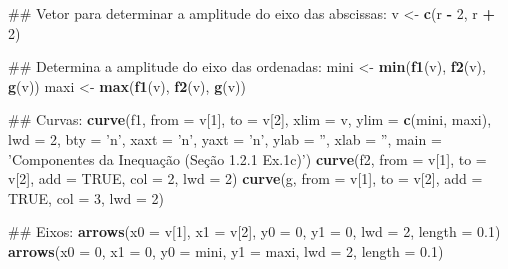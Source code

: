 \documentclass[]{book}
\newenvironment{Shaded}{\begin{snugshade}}{\end{snugshade}}
\newcommand{\KeywordTok}[1]{\textcolor[rgb]{0.13,0.29,0.53}{\textbf{#1}}}
\newcommand{\DataTypeTok}[1]{\textcolor[rgb]{0.13,0.29,0.53}{#1}}
\newcommand{\DecValTok}[1]{\textcolor[rgb]{0.00,0.00,0.81}{#1}}
\newcommand{\FloatTok}[1]{\textcolor[rgb]{0.00,0.00,0.81}{#1}}
\newcommand{\StringTok}[1]{\textcolor[rgb]{0.31,0.60,0.02}{#1}}
\newcommand{\OtherTok}[1]{\textcolor[rgb]{0.56,0.35,0.01}{#1}}
\newcommand{\OperatorTok}[1]{\textcolor[rgb]{0.81,0.36,0.00}{\textbf{#1}}}
\newcommand{\NormalTok}[1]{#1}
\begin{document}
\begin{enumerate}
\begin{Shaded}
\begin{Highlighting}[]
\NormalTok{##  Vetor para determinar a amplitude do eixo das abscissas:}
\NormalTok{v <-}\StringTok{ }\KeywordTok{c}\NormalTok{(r }\OperatorTok{-}\StringTok{ }\DecValTok{2}\NormalTok{, r }\OperatorTok{+}\StringTok{ }\DecValTok{2}\NormalTok{)}

\NormalTok{##  Determina  a amplitude do eixo das ordenadas:}
\NormalTok{mini <-}\StringTok{ }\KeywordTok{min}\NormalTok{(}\KeywordTok{f1}\NormalTok{(v), }\KeywordTok{f2}\NormalTok{(v), }\KeywordTok{g}\NormalTok{(v))}
\NormalTok{maxi <-}\StringTok{ }\KeywordTok{max}\NormalTok{(}\KeywordTok{f1}\NormalTok{(v), }\KeywordTok{f2}\NormalTok{(v), }\KeywordTok{g}\NormalTok{(v))}

\NormalTok{##  Curvas:}
\KeywordTok{curve}\NormalTok{(f1, }\DataTypeTok{from =}\NormalTok{ v[}\DecValTok{1}\NormalTok{], }\DataTypeTok{to =}\NormalTok{ v[}\DecValTok{2}\NormalTok{], }\DataTypeTok{xlim =}\NormalTok{ v, }\DataTypeTok{ylim =} \KeywordTok{c}\NormalTok{(mini, maxi), }\DataTypeTok{lwd =} \DecValTok{2}\NormalTok{,}
  \DataTypeTok{bty =} \StringTok{'n'}\NormalTok{, }\DataTypeTok{xaxt =} \StringTok{'n'}\NormalTok{, }\DataTypeTok{yaxt =} \StringTok{'n'}\NormalTok{, }\DataTypeTok{ylab =} \StringTok{''}\NormalTok{, }\DataTypeTok{xlab =} \StringTok{''}\NormalTok{,}
  \DataTypeTok{main =} \StringTok{'Componentes da Inequação (Seção 1.2.1 Ex.1c)'}\NormalTok{)}
\KeywordTok{curve}\NormalTok{(f2, }\DataTypeTok{from =}\NormalTok{ v[}\DecValTok{1}\NormalTok{], }\DataTypeTok{to =}\NormalTok{ v[}\DecValTok{2}\NormalTok{], }\DataTypeTok{add =} \OtherTok{TRUE}\NormalTok{, }\DataTypeTok{col =} \DecValTok{2}\NormalTok{, }\DataTypeTok{lwd =} \DecValTok{2}\NormalTok{)}
\KeywordTok{curve}\NormalTok{(g, }\DataTypeTok{from =}\NormalTok{ v[}\DecValTok{1}\NormalTok{], }\DataTypeTok{to =}\NormalTok{ v[}\DecValTok{2}\NormalTok{], }\DataTypeTok{add =} \OtherTok{TRUE}\NormalTok{, }\DataTypeTok{col =} \DecValTok{3}\NormalTok{, }\DataTypeTok{lwd =} \DecValTok{2}\NormalTok{)}

\NormalTok{##  Eixos:}
\KeywordTok{arrows}\NormalTok{(}\DataTypeTok{x0 =}\NormalTok{ v[}\DecValTok{1}\NormalTok{], }\DataTypeTok{x1 =}\NormalTok{ v[}\DecValTok{2}\NormalTok{],}
   \DataTypeTok{y0 =} \DecValTok{0}\NormalTok{, }\DataTypeTok{y1 =} \DecValTok{0}\NormalTok{, }\DataTypeTok{lwd =} \DecValTok{2}\NormalTok{, }\DataTypeTok{length =} \FloatTok{0.1}\NormalTok{)}
\KeywordTok{arrows}\NormalTok{(}\DataTypeTok{x0 =} \DecValTok{0}\NormalTok{, }\DataTypeTok{x1 =} \DecValTok{0}\NormalTok{,}
   \DataTypeTok{y0 =}\NormalTok{ mini, }\DataTypeTok{y1 =}\NormalTok{ maxi, }\DataTypeTok{lwd =} \DecValTok{2}\NormalTok{, }\DataTypeTok{length =} \FloatTok{0.1}\NormalTok{)}


\end{Highlighting}
\end{Shaded}
\end{enumerate}
\end{document}
